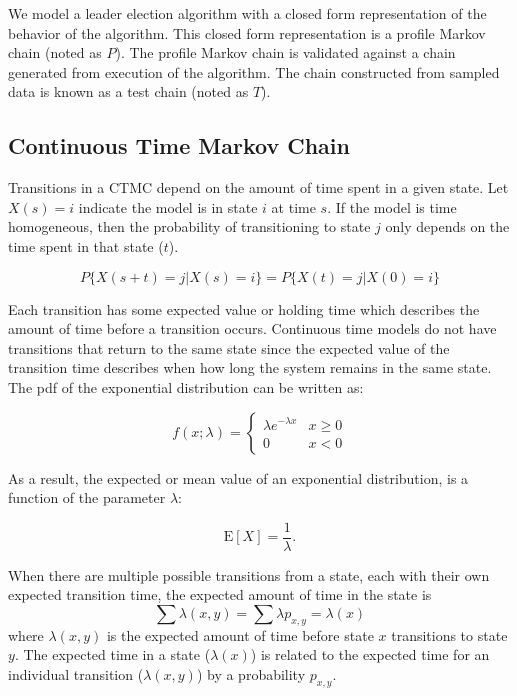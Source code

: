 We model a leader election algorithm with a closed form representation of the behavior of the algorithm.
This closed form representation is a profile Markov chain (noted as $P$).
The profile Markov chain is validated against a chain generated from execution of the algorithm.
The chain constructed from sampled data is known as a test chain (noted as $T$).

\subsection{Continuous Time Markov Chain}

Transitions in a \ac{CTMC} depend on the amount of time spent in a given state.
Let $X(s) = i$ indicate the model is in state $i$ at time $s$.
If the model is time homogeneous, then the probability of transitioning to state $j$ only depends on the time spent in that state ($t$).

\begin{equation}
P\{ X(s+t)=j | X(s) = i \} = P\{ X(t)=j | X(0) = i \}
\end{equation}

Each transition has some expected value or holding time which describes the amount of time before a transition occurs.
Continuous time models do not have transitions that return to the same state since the expected value of the transition time describes when how long the system  remains in the same state.
The \ac{pdf} of the exponential distribution can be written as: \cite{MARKOV1}

\begin{equation}
f(x;\lambda) = \begin{cases}
\lambda e^{-\lambda x} & x \ge 0 \\
0 & x < 0
\end{cases}
\end{equation}

As a result, the expected or mean value of an exponential distribution, is a function of
the parameter $\lambda$: \cite{MARKOV1}

\begin{equation}
\mathrm{E}[X] = \frac{1}{\lambda}. \!
\end{equation}

When there are multiple possible transitions from a state, each with their own expected transition time, the expected amount of time in the state is \cite{MARKOV2}
\begin{equation}
\sum \lambda(x,y) = \sum \lambda p_{x,y} = \lambda(x)
\end{equation}
where $\lambda(x,y)$ is the expected amount of time before state $x$ transitions to state $y$.
The expected time in a state ($\lambda(x)$) is related to the expected time for an individual transition ($\lambda(x,y)$) by a probability $p_{x,y}$.

